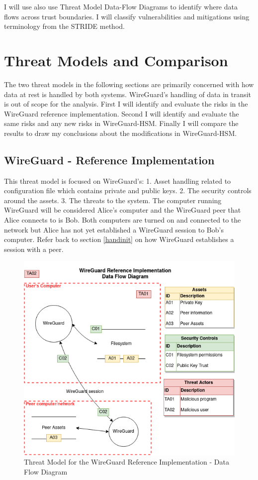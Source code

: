 \documentclass [11pt, proquest] {uwthesis}[2020/02/24]
\begin{document}
I will use also use Threat Model Data-Flow Diagrams to identify where data flows across trust boundaries.
I will classify vulnerabilities and mitigations using terminology from the STRIDE method\cite{hernan_uncover_2019}.

\chapter {Threat Models and Comparison}
The two threat models in the following sections are primarily concerned with how data at rest is handled by both systems. WireGuard's handling of data in transit is out of scope for the analysis.
First I will identify and evaluate the risks in the WireGuard reference implementation. Second I will identify and evaluate the same risks and any new risks in WireGuard-HSM. Finally I will compare the results to draw my conclusions about the modifications in WireGuard-HSM.

\section {WireGuard - Reference Implementation}
\label{wg-ref-analysis}
This threat model is focused on WireGuard's: 1. Asset handling related to configuration file which contains private and public keys. 2. The security controls around the assets. 3. The threats to the system. 
The computer running WireGuard will be considered Alice's computer and the WireGuard peer that Alice connects to is Bob. Both computers are turned on and connected to the network but Alice has not yet established a WireGuard session to Bob's computer. Refer back to section \ref{handinit} on how WireGuard establishes a session with a peer. 

\begin{figure}[ht]
\includegraphics[width=14cm]{paper/images/WGH_DFD.png}
\caption{Threat Model for the WireGuard Reference Implementation - Data Flow Diagram}
\label{fig:wg_ref_dfd}
\end{figure}
\end{document}
